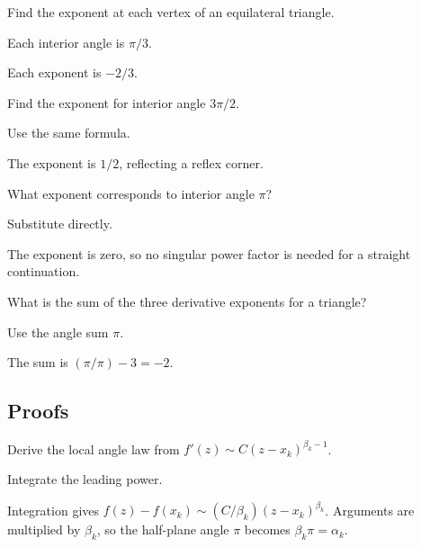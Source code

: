\begin{exercise}\label{exr:iv18-expand-02}
Find the exponent at each vertex of an equilateral triangle.
\end{exercise}
\begin{hint}
Each interior angle is \(\pi/3\).
\end{hint}
\begin{solution}
Each exponent is \(-2/3\).
\end{solution}

\begin{exercise}\label{exr:iv18-expand-03}
Find the exponent for interior angle \(3\pi/2\).
\end{exercise}
\begin{hint}
Use the same formula.
\end{hint}
\begin{solution}
The exponent is \(1/2\), reflecting a reflex corner.
\end{solution}

\begin{exercise}\label{exr:iv18-expand-04}
What exponent corresponds to interior angle \(\pi\)?
\end{exercise}
\begin{hint}
Substitute directly.
\end{hint}
\begin{solution}
The exponent is zero, so no singular power factor is needed for a straight continuation.
\end{solution}

\begin{exercise}\label{exr:iv18-expand-05}
What is the sum of the three derivative exponents for a triangle?
\end{exercise}
\begin{hint}
Use the angle sum \(\pi\).
\end{hint}
\begin{solution}
The sum is \((\pi/\pi)-3=-2\).
\end{solution}

\subsection*{Proofs}

\begin{exercise}\label{exr:iv18-expand-06}
Derive the local angle law from \(f'(z)\sim C(z-x_k)^{\beta_k-1}\).
\end{exercise}
\begin{hint}
Integrate the leading power.
\end{hint}
\begin{solution}
Integration gives \(f(z)-f(x_k)\sim (C/\beta_k)(z-x_k)^{\beta_k}\). Arguments are multiplied by \(\beta_k\), so the half-plane angle \(\pi\) becomes \(\beta_k\pi=\alpha_k\).
\end{solution}


